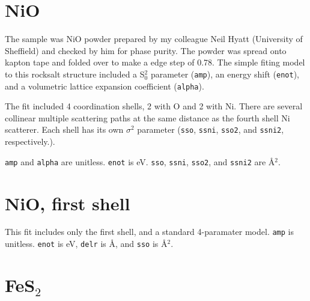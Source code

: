 \documentclass{article}
\let\stdsection\section
\renewcommand\section{\newpage\stdsection}
\begin{document}
\section{NiO}

\normalsize

The sample was NiO powder prepared by my colleague Neil Hyatt
(University of Sheffield) and checked by him for phase purity.  The
powder was spread onto kapton tape and folded over to make a edge step
of 0.78.  The simple fiting model to this rocksalt structure included
a S$_0^2$ parameter (\texttt{amp}), an energy shift (\texttt{enot}),
and a volumetric lattice expansion coefficient (\texttt{alpha}).

The fit included 4 coordination shells, 2 with O and 2 with Ni.  There
are several collinear multiple scattering paths at the same distance
as the fourth shell Ni scatterer.  Each shell has its own $\sigma^2$
parameter (\texttt{sso}, \texttt{ssni}, \texttt{sso2}, and
\texttt{ssni2}, respectively.).

\texttt{amp} and \texttt{alpha} are unitless.  \texttt{enot} is eV.
\texttt{sso}, \texttt{ssni}, \texttt{sso2}, and \texttt{ssni2} are
\AA$^2$.


\def\feffmaterial{NiO}
\def\feffrone{2.5}
\def\feffrtwo{3}
\def\feffrthree{3.7}
\def\feffrfour{4.2}
\def\feffrfive{4.7}
\def\fefffirst{}

\small

\fitplots




\section{NiO, first shell}

\normalsize
This fit includes only the first shell, and a standard 4-paramater
model.  \texttt{amp} is unitless.  \texttt{enot} is eV, \texttt{delr}
is \AA, and \texttt{sso} is \AA$^2$.


\def\fefffirst{_1st}

\small

\fitplots






\section{FeS$_2$}
\normalsize
\end{document}
